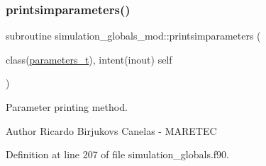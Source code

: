 \subsubsection{\texorpdfstring{printsimparameters()}{printsimparameters()}}
{\footnotesize\ttfamily subroutine simulation\+\_\+globals\+\_\+mod\+::printsimparameters (\begin{DoxyParamCaption}\item[{class(\mbox{\hyperlink{structsimulation__globals__mod_1_1parameters__t}{parameters\+\_\+t}}), intent(inout)}]{self }\end{DoxyParamCaption})\hspace{0.3cm}{\ttfamily [private]}}



Parameter printing method. 

\begin{DoxyAuthor}{Author}
Ricardo Birjukovs Canelas -\/ M\+A\+R\+E\+T\+EC 
\end{DoxyAuthor}


Definition at line 207 of file simulation\+\_\+globals.\+f90.


